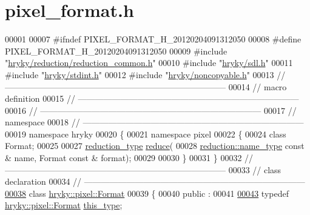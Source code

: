 \hypertarget{pixel__format_8h_source}{\section{pixel\-\_\-format.\-h}
}

\begin{DoxyCode}
00001 
00007 \textcolor{preprocessor}{#ifndef PIXEL\_FORMAT\_H\_20120204091312050}
00008 \textcolor{preprocessor}{}\textcolor{preprocessor}{#define PIXEL\_FORMAT\_H\_20120204091312050}
00009 \textcolor{preprocessor}{}\textcolor{preprocessor}{#include "\hyperlink{reduction__common_8h}{hryky/reduction/reduction_common.h}"}
00010 \textcolor{preprocessor}{#include "\hyperlink{sdl_8h}{hryky/sdl.h}"}
00011 \textcolor{preprocessor}{#include "\hyperlink{stdint_8h}{hryky/stdint.h}"}
00012 \textcolor{preprocessor}{#include "\hyperlink{noncopyable_8h}{hryky/noncopyable.h}"}
00013 \textcolor{comment}{//
      ------------------------------------------------------------------------------}
00014 \textcolor{comment}{// macro definition}
00015 \textcolor{comment}{//
      ------------------------------------------------------------------------------}
00016 \textcolor{comment}{//
      ------------------------------------------------------------------------------}
00017 \textcolor{comment}{// namespace}
00018 \textcolor{comment}{//
      ------------------------------------------------------------------------------}
00019 \textcolor{keyword}{namespace }hryky
00020 \{
00021 \textcolor{keyword}{namespace }pixel
00022 \{
00024     \textcolor{keyword}{class }Format;
00025 
00027     \hyperlink{namespacehryky_a343a9a4c36a586be5c2693156200eadc}{reduction_type} \hyperlink{namespacehryky_af41cb3af6766761da0ff21b84527a52c}{reduce}(
00028         \hyperlink{namespacehryky_1_1reduction_ac686c30a4c8d196bbd0f05629a6b921f}{reduction::name_type} \textcolor{keyword}{const} & name, Format \textcolor{keyword}{const} & format);
00029 
00030 \}
00031 \}
00032 \textcolor{comment}{//
      ------------------------------------------------------------------------------}
00033 \textcolor{comment}{// class declaration}
00034 \textcolor{comment}{//
      ------------------------------------------------------------------------------}
\hypertarget{pixel__format_8h_source_l00038}{}\hyperlink{classhryky_1_1pixel_1_1_format}{00038} \textcolor{comment}{}\textcolor{keyword}{class }\hyperlink{classhryky_1_1pixel_1_1_format}{hryky::pixel::Format}
00039 \{
00040 \textcolor{keyword}{public} :
00041 
\hypertarget{pixel__format_8h_source_l00043}{}\hyperlink{classhryky_1_1pixel_1_1_format_a020a3436c6988f39e98d127ecb85c000}{00043}     \textcolor{keyword}{typedef} \hyperlink{classhryky_1_1pixel_1_1_format}{hryky::pixel::Format} \hyperlink{classhryky_1_1pixel_1_1_format_a020a3436c6988f39e98d127ecb85c000}{this_type};

\end{DoxyCode}
